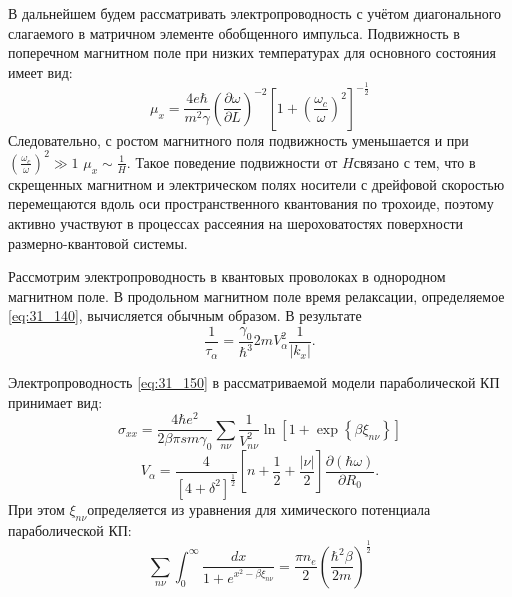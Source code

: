 В дальнейшем будем рассматривать электропроводность с учётом диагонального слагаемого в матричном элементе обобщенного импульса. Подвижность в поперечном магнитном поле при низких температурах для основного состояния имеет вид:
\begin{equation} \label{eq:32_50}
\mu _{x} =\frac{4e\hbar }{m^{2} \gamma } \left(\frac{\partial \omega }{\partial L} \right)^{-2} \left[1+\left(\frac{\omega _{c} }{\omega } \right)^{2} \right]^{-\frac{1}{2} }
\end{equation}
Следовательно, с ростом магнитного поля подвижность уменьшается и при $\left(\frac{\omega _{c} }{\omega } \right)^{2} \gg 	1$ $\mu _{x} \sim \frac{1}{H} $. Такое поведение подвижности от $H$связано с тем, что в скрещенных магнитном и электрическом полях носители с дрейфовой скоростью перемещаются вдоль оси пространственного квантования по трохоиде, поэтому активно участвуют в процессах рассеяния на шероховатостях поверхности размерно-квантовой системы. 

Рассмотрим электропроводность в квантовых проволоках в однородном магнитном поле. В продольном магнитном поле время релаксации, определяемое \eqref{eq:31_140}, вычисляется обычным образом. В результате
\begin{equation} \label{eq:32_60}
\frac{1}{\tau _{\alpha } } =\frac{\gamma _{0} }{\hbar ^{3} } 2mV_{\alpha }^{2} \frac{1}{\left|k_{x} \right|} . 
\end{equation}

Электропроводность \eqref{eq:31_150} в рассматриваемой модели параболической КП принимает вид:
\begin{equation} \label{eq:32_70}
\sigma _{xx} =\frac{4\hbar e^{2} }{2\beta \pi sm\gamma _{0} } \sum _{n\nu }\frac{1}{V_{n\nu }^{2} } \ln \left[1+\exp \left\{\beta \xi _{n\nu } \right\}\right]
\end{equation}
\[
V_{\alpha } =\frac{4}{\left[4+\delta ^{2} \right]^{\frac{1}{2} } } \left[n+\frac{1}{2} +\frac{\left|\nu \right|}{2} \right]\frac{\partial (\hbar \omega )}{\partial R_{0} } .
\] 
При этом $\xi _{n\nu } $определяется из уравнения для химического потенциала параболической КП:
\begin{equation} \label{eq:32_80}
\sum _{n\nu }\int _{0}^{\infty }\frac{dx}{1+e^{x^{2} -\beta \xi _{n\nu } } } =\frac{\pi n_{e} }{2} \left(\frac{\hbar ^{2} \beta }{2m} \right)^{\frac{1}{2} } 
\end{equation}

